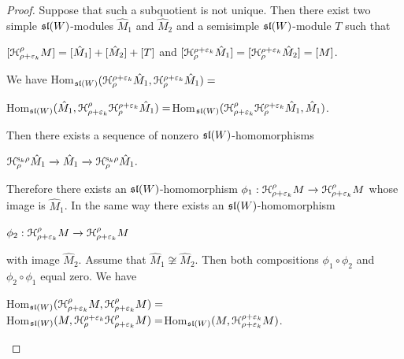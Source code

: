 \documentclass[12pt]{amsart}
\theoremstyle{definition}\newtheorem{theorem}{Theorem}[section]
\theoremstyle{definition}\newtheorem{definition}[proposition]{Definition}
\theoremstyle{remark}\newtheorem{example}[proposition]{Example}
\renewcommand{\to}[1][]{\xrightarrow{#1}}
\begin{document}
\begin{proof}
Suppose that such a subquotient is not unique. Then there exist two simple $\frak{sl}(W)$-modules $\hat M_1$ and $\hat M_2$ and a semisimple $\frak{sl}(W)$-module $T$ such that \begin{center}$[\EuScript H^\rho_{\rho+\varepsilon_k}M]=[\hat M_1]+[\hat M_2]+[T]$ and $[\EuScript H_\rho^{\rho+\varepsilon_k}\hat M_1]=[\EuScript H_\rho^{\rho+\varepsilon_k}\hat M_2]=[M]$.\end{center} We have Hom$_{\frak{sl}(W)}(\EuScript H_\rho^{\rho+\varepsilon_k}\hat M_1, \EuScript H_\rho^{\rho+\varepsilon_k}\hat M_1)=$\begin{center}Hom$_{\frak{sl}(W)}(\hat M_1, \EuScript H^\rho_{\rho+\varepsilon_k}\EuScript H_\rho^{\rho+\varepsilon_k}\hat M_1)=$Hom$_{\frak{sl}(W)}(\EuScript H^\rho_{\rho+\varepsilon_k}\EuScript H_\rho^{\rho+\varepsilon_k}\hat M_1, \hat M_1)$.\end{center}
Then there exists a sequence of nonzero $\frak{sl}(W)$-homomorphisms\begin{center}
$\EuScript H_\rho^{\mathrm s_k\rho}\hat M_1\to\hat M_1\to\EuScript H_\rho^{\mathrm s_k\rho}\hat M_1.$\end{center}
Therefore there exists an $\frak{sl}(W)$-homomorphism $\phi_1: \EuScript H^\rho_{\rho+\varepsilon_k}M\to \EuScript H^\rho_{\rho+\varepsilon_k}M$ whose image is $\hat M_1$. In the same way there exists an $\frak{sl}(W)$-homomorphism \begin{center}$\phi_2:\EuScript H^\rho_{\rho+\varepsilon_k}M\to\EuScript H^\rho_{\rho+\varepsilon_k}M$\end{center}with image $\hat M_2$. Assume that $\hat M_1\not\cong\hat M_2$. Then both compositions $\phi_1\circ\phi_2$ and $\phi_2\circ\phi_1$ equal zero. We have \begin{center}Hom$_{\frak{sl}(W)}(\EuScript H^\rho_{\rho+\varepsilon_k}M, \EuScript H^\rho_{\rho+\varepsilon_k}M)=$\\Hom$_{\frak{sl}(W)}(M, \EuScript H_\rho^{\rho+\varepsilon_k}\EuScript H^\rho_{\rho+\varepsilon_k}M)=$Hom$_{\frak{sl}(W)}(M, \EuScript H^{\rho+\varepsilon_k}_{\rho+\varepsilon_k}M)$.\end{center}

\end{proof}
\end{document}

